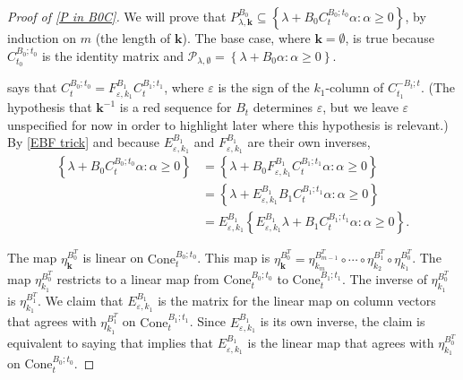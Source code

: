 \documentclass{amsart}
\newtheorem{proposition}{Proposition}[section]
\theoremstyle{definition}
\theoremstyle{remark}
\numberwithin{equation}{section}
\newcommand{\ep}{\varepsilon}
\newcommand{\set}[1]{{\left\lbrace #1 \right\rbrace}}
\newcommand{\0}{{\mathbf{0}}}
\newcommand{\Cone}{\mathrm{Cone}}
\newcommand{\kk}{\mathbf{k}}
\renewcommand{\P}{\mathcal{P}}
\begin{document}
%


\begin{proof}[Proof of \cref{P in B0C}]
We will prove that $P^{B_0}_{\lambda,\kk}\subseteq\set{\lambda+B_0C_t^{B_0;t_0}\alpha:\alpha\ge0}$, by induction on $m$ (the length of $\kk$).
The base case, where $\kk=\emptyset$, is true because $C_{t_0}^{B_0;t_0}$ is the identity matrix and $\P_{\lambda,\emptyset}=\set{\lambda+B_0\alpha:\alpha\ge0}$.
 
\cite[Proposition~1.4]{NZ12} says that $C_t^{B_0;t_0}=F^{B_1}_{\ep,k_1}C_t^{B_1;t_1}$, where $\ep$ is the sign of the $k_1$-column of $C_{t_1}^{-B_t;t}$.  
(The hypothesis that $\kk^{-1}$ is a red sequence for $B_t$ determines $\ep$, but we leave $\ep$ unspecified for now in order to highlight later where this hypothesis is relevant.)
By \cref{EBF trick} and because $E^{B_1}_{\ep,k_1}$ and $F^{B_1}_{\ep,k_1}$ are their own inverses,
\begin{equation}\label{ind B0C}\begin{aligned}
\set{\lambda+B_0C_t^{B_0;t_0}\alpha:\alpha\ge0}
&=\set{\lambda+B_0F^{B_1}_{\ep,k_1}C_t^{B_1;t_1}\alpha:\alpha\ge0}\\
&=\set{\lambda+E^{B_1}_{\ep,k_1}B_1C_t^{B_1;t_1}\alpha:\alpha\ge0}\\
&=E^{B_1}_{\ep,k_1}\set{E^{B_1}_{\ep,k_1}\lambda+B_1C_t^{B_1;t_1}\alpha:\alpha\ge0}.
\end{aligned}\end{equation}

The map $\eta_{\kk}^{B_0^T}$ is linear on $\Cone_t^{B_0;t_0}$.  
This map is $\eta_{\kk}^{B_0^T}={\eta_{k_m}^{B_{m-1}^T}\circ\cdots\circ\eta_{k_2}^{B_1^T}\circ\eta_{k_1}^{B_0^T}}$.
The map $\eta_{k_1}^{B_0^T}$ restricts to a linear map from $\Cone_t^{B_0;t_0}$ to $\Cone_t^{B_1;t_1}$.
The inverse of $\eta_{k_1}^{B_0^T}$ is $\eta_{k_1}^{B_1^T}$.
We claim that $E^{B_1}_{\ep,k_1}$ is the matrix for the linear map on column vectors that agrees with $\eta_{k_1}^{B_1^T}$ on $\Cone_t^{B_1;t_1}$.
Since $E^{B_1}_{\ep,k_1}$ is its own inverse, the claim is equivalent to saying that implies that $E^{B_1}_{\ep,k_1}$ is the linear map that agrees with $\eta_{k_1}^{B_0^T}$ on $\Cone_t^{B_0;t_0}$.


\end{proof}
\end{document}
